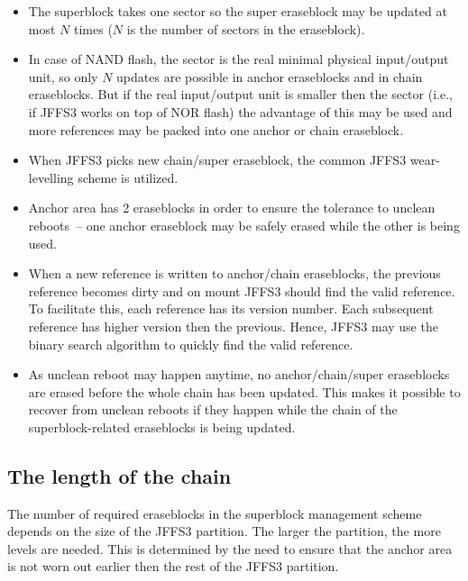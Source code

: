 \begin{itemize}

\item The superblock takes one sector so the super eraseblock may be updated at
most $N$ times ($N$ is the number of sectors in the eraseblock).

\item In case of NAND flash, the sector is the real minimal physical
input/output unit, so only $N$ updates are possible in anchor eraseblocks
and in chain eraseblocks. But if the real input/output unit is smaller then
the sector (i.e., if JFFS3 works on top of NOR flash) the advantage of this may
be used and more references may be packed into one anchor or chain eraseblock.

\item When JFFS3 picks new chain/super eraseblock, the common JFFS3
\mbox{wear-levelling} scheme is utilized.

\item Anchor area has 2 eraseblocks in order to ensure the tolerance to unclean
reboots~-- one anchor eraseblock may be safely erased while the other is being
used.

\item When a new reference is written to anchor/chain eraseblocks, the previous
reference becomes dirty and on mount JFFS3 should find the valid reference. To
facilitate this, each reference has its version number. Each subsequent
reference has higher version then the previous. Hence, JFFS3 may use the
binary search algorithm to quickly find the valid reference.

\item As unclean reboot may happen anytime, no anchor/chain/super eraseblocks
are erased before the whole chain has been updated. This makes it possible to
recover from unclean reboots if they happen while the chain of the
\mbox{superblock-related} eraseblocks is being updated.

\end{itemize}

%
%
\subsection{The length of the chain}

The number of required eraseblocks in the superblock management scheme depends
on the size of the JFFS3 partition. The larger the partition, the more levels
are needed. This is determined by the need to ensure that the anchor area is
not worn out earlier then the rest of the JFFS3 partition.

